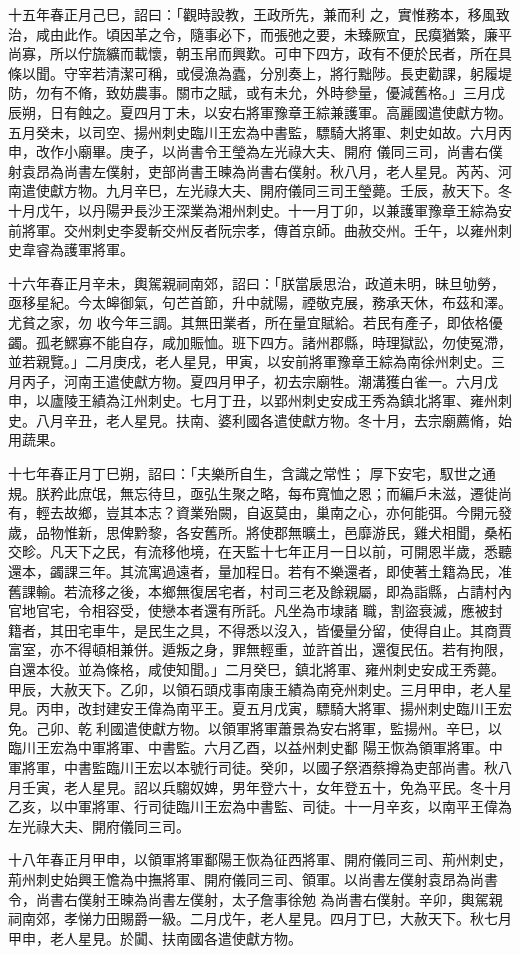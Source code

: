 \begin{pinyinscope}
 十五年春正月己巳，詔曰：「觀時設教，王政所先，兼而利
 之，實惟務本，移風致治，咸由此作。頃因革之令，隨事必下，而張弛之要，未臻厥宜，民瘼猶繁，廉平尚寡，所以佇旒纊而載懷，朝玉帛而興歎。可申下四方，政有不便於民者，所在具條以聞。守宰若清潔可稱，或侵漁為蠹，分別奏上，將行黜陟。長吏勸課，躬履堤防，勿有不脩，致妨農事。關市之賦，或有未允，外時參量，優減舊格。」三月戊辰朔，日有蝕之。夏四月丁未，以安右將軍豫章王綜兼護軍。高麗國遣使獻方物。五月癸未，以司空、揚州刺史臨川王宏為中書監，驃騎大將軍、刺史如故。六月丙申，改作小廟畢。庚子，以尚書令王瑩為左光祿大夫、開府
 儀同三司，尚書右僕射袁昂為尚書左僕射，吏部尚書王暕為尚書右僕射。秋八月，老人星見。芮芮、河南遣使獻方物。九月辛巳，左光祿大夫、開府儀同三司王瑩薨。壬辰，赦天下。冬十月戊午，以丹陽尹長沙王深業為湘州刺史。十一月丁卯，以兼護軍豫章王綜為安前將軍。交州刺史李畟斬交州反者阮宗孝，傳首京師。曲赦交州。壬午，以雍州刺史韋睿為護軍將軍。



 十六年春正月辛未，輿駕親祠南郊，詔曰：「朕當扆思治，政道未明，昧旦劬勞，亟移星紀。今太皞御氣，句芒首節，升中就陽，禋敬克展，務承天休，布茲和澤。尤貧之家，勿
 收今年三調。其無田業者，所在量宜賦給。若民有產子，即依格優蠲。孤老鰥寡不能自存，咸加賑恤。班下四方。諸州郡縣，時理獄訟，勿使冤滯，並若親覽。」二月庚戌，老人星見，甲寅，以安前將軍豫章王綜為南徐州刺史。三月丙子，河南王遣使獻方物。夏四月甲子，初去宗廟牲。潮溝獲白雀一。六月戊申，以廬陵王績為江州刺史。七月丁丑，以郢州刺史安成王秀為鎮北將軍、雍州刺史。八月辛丑，老人星見。扶南、婆利國各遣使獻方物。冬十月，去宗廟薦脩，始用蔬果。



 十七年春正月丁巳朔，詔曰：「夫樂所自生，含識之常性；
 厚下安宅，馭世之通規。朕矜此庶氓，無忘待旦，亟弘生聚之略，每布寬恤之恩；而編戶未滋，遷徙尚有，輕去故鄉，豈其本志？資業殆闕，自返莫由，巢南之心，亦何能弭。今開元發歲，品物惟新，思俾黔黎，各安舊所。將使郡無曠土，邑靡游民，雞犬相聞，桑柘交畛。凡天下之民，有流移他境，在天監十七年正月一日以前，可開恩半歲，悉聽還本，蠲課三年。其流寓過遠者，量加程日。若有不樂還者，即使著土籍為民，准舊課輸。若流移之後，本鄉無復居宅者，村司三老及餘親屬，即為詣縣，占請村內官地官宅，令相容受，使戀本者還有所託。凡坐為市埭諸
 職，割盜衰滅，應被封籍者，其田宅車牛，是民生之具，不得悉以沒入，皆優量分留，使得自止。其商賈富室，亦不得頓相兼併。遁叛之身，罪無輕重，並許首出，還復民伍。若有拘限，自還本役。並為條格，咸使知聞。」二月癸巳，鎮北將軍、雍州刺史安成王秀薨。甲辰，大赦天下。乙卯，以領石頭戍事南康王績為南兗州刺史。三月甲申，老人星見。丙申，改封建安王偉為南平王。夏五月戊寅，驃騎大將軍、揚州刺史臨川王宏免。己卯、乾利國遣使獻方物。以領軍將軍蕭景為安右將軍，監揚州。辛巳，以臨川王宏為中軍將軍、中書監。六月乙酉，以益州刺史鄱
 陽王恢為領軍將軍。中軍將軍，中書監臨川王宏以本號行司徒。癸卯，以國子祭酒蔡撙為吏部尚書。秋八月壬寅，老人星見。詔以兵騶奴婢，男年登六十，女年登五十，免為平民。冬十月乙亥，以中軍將軍、行司徒臨川王宏為中書監、司徒。十一月辛亥，以南平王偉為左光祿大夫、開府儀同三司。



 十八年春正月甲申，以領軍將軍鄱陽王恢為征西將軍、開府儀同三司、荊州刺史，荊州刺史始興王憺為中撫將軍、開府儀同三司、領軍。以尚書左僕射袁昂為尚書令，尚書右僕射王暕為尚書左僕射，太子詹事徐勉
 為尚書右僕射。辛卯，輿駕親祠南郊，孝悌力田賜爵一級。二月戊午，老人星見。四月丁巳，大赦天下。秋七月甲申，老人星見。於闐、扶南國各遣使獻方物。



\end{pinyinscope}
